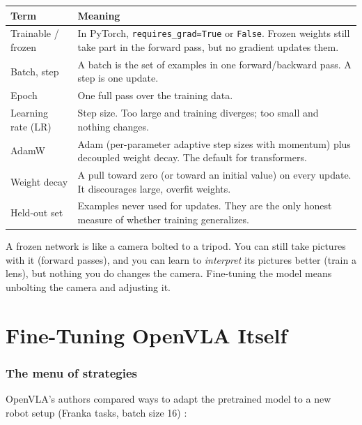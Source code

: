 \documentclass[11pt]{article}
\begin{document}
\begin{center}
\begin{tabularx}{\linewidth}{@{}lX@{}}
\toprule
Term & Meaning \\
\midrule
Trainable / frozen & In PyTorch, \texttt{requires\_grad=True} or \texttt{False}. Frozen weights still take part in the forward pass, but no gradient updates them. \\
Batch, step & A batch is the set of examples in one forward/backward pass. A step is one update. \\
Epoch & One full pass over the training data. \\
Learning rate (LR) & Step size. Too large and training diverges; too small and nothing changes. \\
AdamW & Adam (per-parameter adaptive step sizes with momentum) plus decoupled weight decay. The default for transformers. \\
Weight decay & A pull toward zero (or toward an initial value) on every update. It discourages large, overfit weights. \\
Held-out set & Examples never used for updates. They are the only honest measure of whether training generalizes. \\
\bottomrule
\end{tabularx}
\end{center}

\begin{mental}
A frozen network is like a camera bolted to a tripod. You can still take pictures with it (forward passes), and you can learn to \emph{interpret} its pictures better (train a lens), but nothing you do changes the camera. Fine-tuning the model means unbolting the camera and adjusting it.
\end{mental}

\part{Fine-Tuning OpenVLA Itself}

\section{The menu of strategies}

OpenVLA's authors compared ways to adapt the pretrained model to a new robot setup (Franka tasks, batch size 16) \cite{kim2024openvla}:
\end{document}
